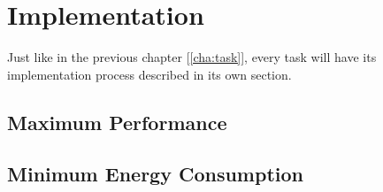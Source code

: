 \chapter{Implementation} %
\label{cha:impl}
	Just like in the previous chapter [\ref{cha:task}], every task will have its implementation process described in its own section.

	\section{Maximum Performance} %
	\label{sec:impl_max_perf}
		

	\section{Minimum Energy Consumption} %
	\label{sec:impl_min_energy}
		
